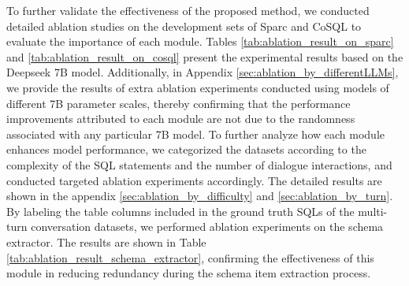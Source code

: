 \documentclass[11pt]{article}
\begin{document}
\begin{table}
    \centering
    \large
    \renewcommand\arraystretch{1.3}
    \caption{Ablation result on CoSQL dev set.}
    \label{tab:ablation_result_on_cosql}
\end{table}

To further validate the effectiveness of the proposed method, we conducted detailed ablation studies on the development sets of Sparc and CoSQL to evaluate the importance of each module. Tables \ref{tab:ablation_result_on_sparc} and \ref{tab:ablation_result_on_cosql} present the experimental results based on the Deepseek 7B model. Additionally, in Appendix \ref{sec:ablation_by_differentLLMs}, we provide the results of extra ablation experiments conducted using models of different 7B parameter scales, thereby confirming that the performance improvements attributed to each module are not due to the randomness associated with any particular 7B model. To further analyze how each module enhances model performance, we categorized the datasets according to the complexity of the SQL statements and the number of dialogue interactions, and conducted targeted ablation experiments accordingly. The detailed results are shown in the appendix \ref{sec:ablation_by_difficulty} and \ref{sec:ablation_by_turn}. By labeling the table columns included in the ground truth SQLs of the multi-turn conversation datasets, we performed ablation experiments on the schema extractor. The results are shown in Table \ref{tab:ablation_result_schema_extractor}, confirming the effectiveness of this module in reducing redundancy during the schema item extraction process.
\end{document}
